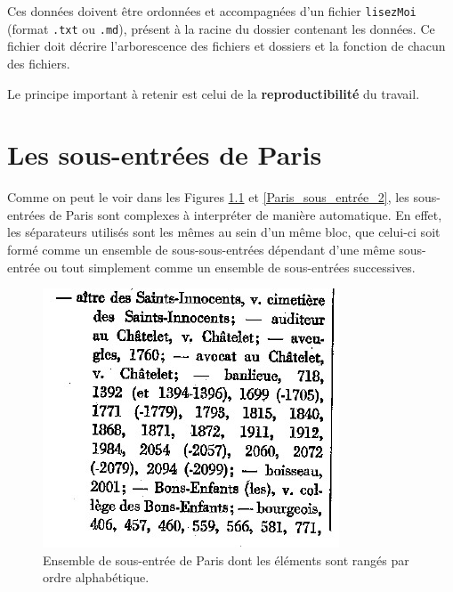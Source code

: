 \documentclass[a4paper,12pt,twoside]{book}
\begin{document}
	Ces données doivent être ordonnées et accompagnées d'un fichier \texttt{lisezMoi} (format \texttt{.txt} ou \texttt{.md}), présent à la racine du dossier contenant les données. Ce fichier doit décrire l'arborescence des fichiers et dossiers et la fonction de chacun des fichiers.
	
	Le principe important à retenir est celui de la \textbf{reproductibilité} du travail.
	
	\appendix
	\chapter{Les sous-entrées de \og Paris\fg{}}
	
	Comme on peut le voir dans les Figures \ref{Paris_sous_entrée_1} et \ref{Paris_sous_entrée_2}, les sous-entrées de Paris sont complexes à interpréter de manière automatique. En effet, les séparateurs utilisés sont les mêmes au sein d'un même bloc, que celui-ci soit formé comme un ensemble de sous-sous-entrées dépendant d'une même sous-entrée ou tout simplement comme un ensemble de sous-entrées successives.
	
	\begin{figure}
		\centering
		\includegraphics[width=\textwidth]{Images/Paris_sous_entrees_1.jpg}
		\caption{Ensemble de sous-entrée de \og Paris\fg{} dont les éléments sont rangés par ordre alphabétique.}
		\label{Paris_sous_entrée_1}
	\end{figure}
\end{document}
